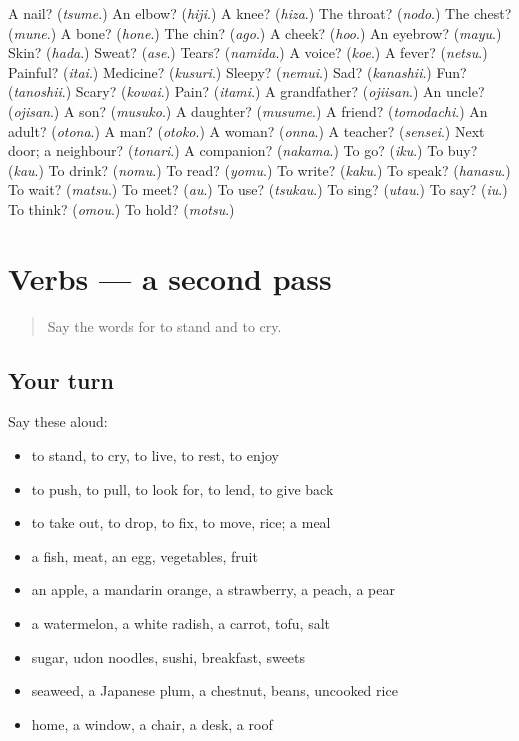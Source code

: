\begin{tcolorbox}[breakable,colback=teal!4,colframe=teal!35!black,title={Before you move on}]
A nail? (\emph{tsume}.) An elbow? (\emph{hiji}.) A knee? (\emph{hiza}.) The throat? (\emph{nodo}.) The chest? (\emph{mune}.) A bone? (\emph{hone}.) The chin? (\emph{ago}.) A cheek? (\emph{hoo}.) An eyebrow? (\emph{mayu}.) Skin? (\emph{hada}.) Sweat? (\emph{ase}.) Tears? (\emph{namida}.) A voice? (\emph{koe}.) A fever? (\emph{netsu}.) Painful? (\emph{itai}.) Medicine? (\emph{kusuri}.) Sleepy? (\emph{nemui}.) Sad? (\emph{kanashii}.) Fun? (\emph{tanoshii}.) Scary? (\emph{kowai}.) Pain? (\emph{itami}.) A grandfather? (\emph{ojiisan}.) An uncle? (\emph{ojisan}.) A son? (\emph{musuko}.) A daughter? (\emph{musume}.) A friend? (\emph{tomodachi}.) An adult? (\emph{otona}.) A man? (\emph{otoko}.) A woman? (\emph{onna}.) A teacher? (\emph{sensei}.) Next door; a neighbour? (\emph{tonari}.) A companion? (\emph{nakama}.) To go? (\emph{iku}.) To buy? (\emph{kau}.) To drink? (\emph{nomu}.) To read? (\emph{yomu}.) To write? (\emph{kaku}.) To speak? (\emph{hanasu}.) To wait? (\emph{matsu}.) To meet? (\emph{au}.) To use? (\emph{tsukau}.) To sing? (\emph{utau}.) To say? (\emph{iu}.) To think? (\emph{omou}.) To hold? (\emph{motsu}.)
\end{tcolorbox}
\section[(dialogue)]{Verbs — a second pass}

\label{lesson:JA-R37-second-pass-verbs}



\begin{quote}
Say the words for to stand and to cry.
\end{quote}

\subsection*{Your turn}
Say these aloud:

\begin{itemize}
\raggedright
  \item to stand, to cry, to live, to rest, to enjoy
  \item to push, to pull, to look for, to lend, to give back
  \item to take out, to drop, to fix, to move, rice; a meal
  \item a fish, meat, an egg, vegetables, fruit
  \item an apple, a mandarin orange, a strawberry, a peach, a pear
  \item a watermelon, a white radish, a carrot, tofu, salt
  \item sugar, udon noodles, sushi, breakfast, sweets
  \item seaweed, a Japanese plum, a chestnut, beans, uncooked rice
  \item home, a window, a chair, a desk, a roof
\end{itemize}

